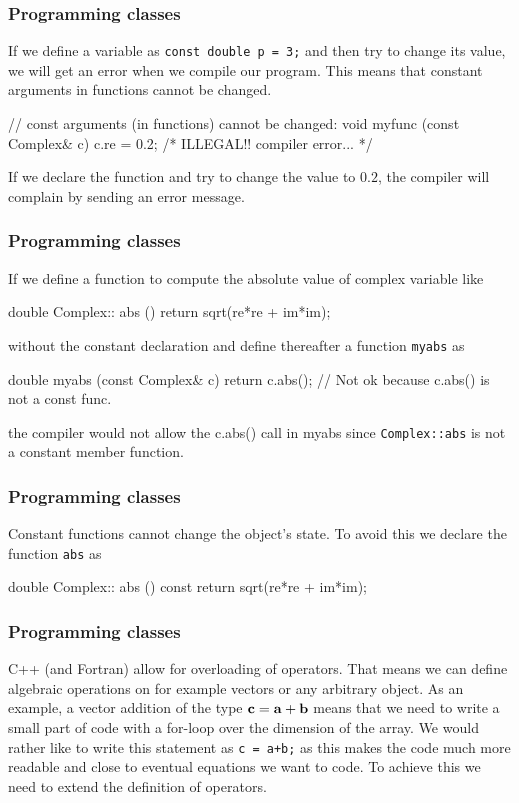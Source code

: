 \documentclass[handout]{beamer}
\begin{document}
\begin{frame}
\frametitle{Programming classes}

If we define a variable as
\Verb!const double p = 3;! and then try to change its value, we will get an error when we
compile our program. This means that constant arguments in functions cannot be changed.

\begin{print}
// const arguments (in functions) cannot be changed:
void myfunc (const Complex& c)
{ c.re = 0.2; /* ILLEGAL!! compiler error... */  }
\end{print}
If we declare the function and try to change the value to $0.2$, the compiler will complain by sending
an error message.
\end{frame}

\begin{frame}
\frametitle{Programming classes}

If we define a function to compute the absolute value of complex variable like

\begin{print}
double Complex:: abs ()  { return sqrt(re*re + im*im);}
\end{print}
without the constant declaration  and define thereafter a function
\Verb!myabs! as

\begin{print}
double myabs (const Complex& c)
{ return c.abs(); }   // Not ok because c.abs() is not a const func.
\end{print}
the compiler would not allow the c.abs() call in myabs
since \Verb!Complex::abs! is not a constant member function.
\end{frame}

\begin{frame}
\frametitle{Programming classes}

Constant functions cannot change the object's state.
To avoid this we declare the function \Verb!abs! as

\begin{print}
double Complex:: abs () const { return sqrt(re*re + im*im); }
\end{print}
\end{frame}

\begin{frame}
\frametitle{Programming classes}

C++ (and Fortran) allow for overloading of operators. That means we
can define algebraic operations on for example vectors or any
arbitrary object.  As an example, a vector addition of the type ${\bf
c} = {\bf a} + {\bf b}$ means that we need to write a small part of
code with a for-loop over the dimension of the array.  We would rather
like to write this statement as \Verb!c = a+b;! as this makes the code much
more readable and close to eventual equations we want to code.  To
achieve this we need to extend the definition of operators.
\end{frame}
\end{document}
